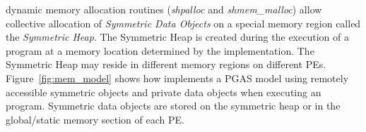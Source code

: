 \openshmem dynamic memory allocation routines (\textit{shpalloc} and
\textit{shmem\_malloc}) allow collective allocation of \emph{Symmetric Data
Objects} on a special memory region called the \emph{Symmetric Heap}. The
Symmetric Heap is created during the execution of a program at a memory location
determined by the implementation. The Symmetric Heap may reside in different
memory regions on different \acp{PE}. Figure~\ref{fig:mem_model} shows how
\openshmem implements a \ac{PGAS} model using remotely accessible symmetric
objects and private data objects when executing an \openshmem program.
Symmetric data objects are stored on the symmetric heap or in the global/static
memory section of each \ac{PE}. 

